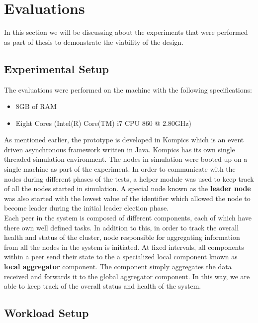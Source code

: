 \documentclass[12pt,a4paper,twoside,openright]{book}
\begin{document}
\chapter{Evaluations}
\label{chap:eval}

In this section we will be discussing about the experiments that were performed as part of thesis to demonstrate the viability of the design.

\section{Experimental Setup}

The evaluations were performed on the machine with the following specifications:

\begin{itemize}
\item 8GB of RAM
\item Eight Cores (Intel(R) Core(TM) i7 CPU 860  @ 2.80GHz)
\end{itemize}

As mentioned earlier, the prototype is developed in Kompics which is an event driven asynchronous framework written in Java. Kompics has its own single threaded simulation environment. The nodes in simulation were booted up on a single machine as part of the experiment. In order to communicate with the nodes during different phases of the tests, a helper module was used to keep track of all the nodes started in simulation. A special node known as the \textbf{leader node} was also started with the lowest value of the identifier which allowed the node to become leader during the initial leader election phase. \\

Each peer in the system is composed of different components, each of which have there own well defined tasks. In addition to this, in order to track the overall health and status of the cluster, node responsible for aggregating information from all the nodes in the system is initiated. At fixed intervals, all components within a peer send their state to the a specialized local component known as \textbf{local aggregator} component. The component simply aggregates the data received and forwards it to the global aggregator component. In this way,  we are able to keep track of the overall status and health of the system.


\section{Workload Setup}
\end{document}
